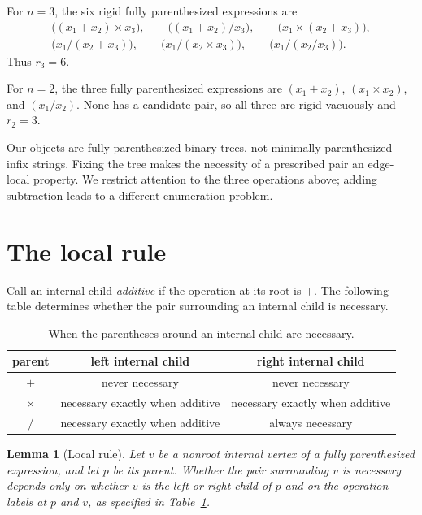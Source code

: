 \documentclass[11pt]{article}
\newtheorem{lemma}[theorem]{Lemma}
\begin{document}
For $n=3$, the six rigid fully parenthesized expressions are
\[
\begin{gathered}
 \bigl((x_1+x_2)\times x_3\bigr),\qquad
 \bigl((x_1+x_2)/x_3\bigr),\qquad
 \bigl(x_1\times(x_2+x_3)\bigr),\\
 \bigl(x_1/(x_2+x_3)\bigr),\qquad
 \bigl(x_1/(x_2\times x_3)\bigr),\qquad
 \bigl(x_1/(x_2/x_3)\bigr).
\end{gathered}
\]
Thus $r_3=6$.

For $n=2$, the three fully parenthesized expressions are
$(x_1+x_2)$, $(x_1\times x_2)$, and $(x_1/x_2)$. None has a candidate pair,
so all three are rigid vacuously and $r_2=3$.

Our objects are fully parenthesized binary trees, not minimally parenthesized
infix strings. Fixing the tree makes the necessity of a prescribed pair an
edge-local property. We restrict attention to the three operations above;
adding subtraction leads to a different enumeration problem.

\section{The local rule}

Call an internal child \emph{additive} if the operation at its root is $+$.
The following table determines whether the pair surrounding an internal child
is necessary.

\begin{table}[ht]
\centering
\small
\begin{tabular}{ccc}
\toprule
parent & left internal child & right internal child \\
\midrule
$+$      & never necessary & never necessary \\
$\times$ & necessary exactly when additive & necessary exactly when additive \\
$/$      & necessary exactly when additive & always necessary \\
\bottomrule
\end{tabular}
\caption{When the parentheses around an internal child are necessary.}
\label{tab:local}
\end{table}

\begin{lemma}[Local rule]\label{lem:local}
Let $v$ be a nonroot internal vertex of a fully parenthesized expression, and
let $p$ be its parent. Whether the pair surrounding $v$ is necessary depends
only on whether $v$ is the left or right child of $p$ and on the operation
labels at $p$ and $v$, as specified in Table~\ref{tab:local}.
\end{lemma}
\end{document}

